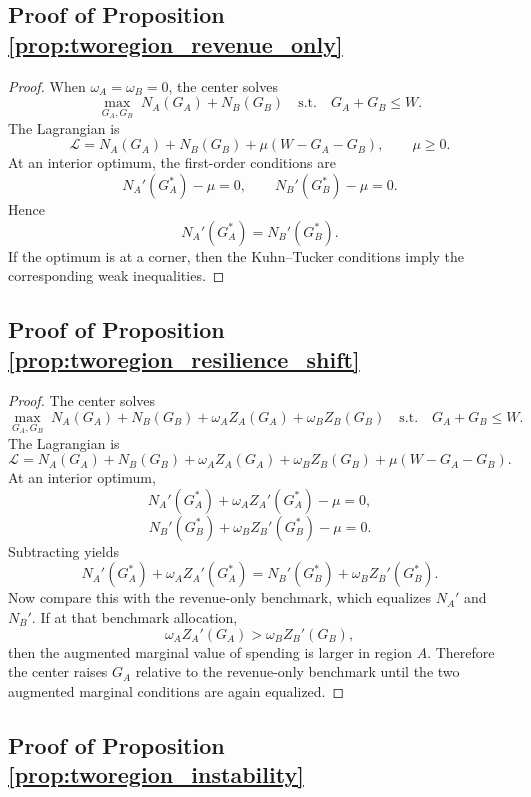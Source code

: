 \documentclass[12pt]{article}
\begin{document}
\subsection{Proof of Proposition \ref{prop:tworegion_revenue_only}}

\begin{proof}
When $\omega_A=\omega_B=0$, the center solves
\[
\max_{G_A,G_B}\; N_A(G_A)+N_B(G_B)
\quad \text{s.t.} \quad G_A+G_B\le W.
\]
The Lagrangian is
\[
\mathcal L = N_A(G_A)+N_B(G_B)+\mu(W-G_A-G_B), \qquad \mu\ge 0.
\]
At an interior optimum, the first-order conditions are
\[
N_A'(G_A^*)-\mu=0, \qquad N_B'(G_B^*)-\mu=0.
\]
Hence
\[
N_A'(G_A^*) = N_B'(G_B^*).
\]
If the optimum is at a corner, then the Kuhn--Tucker conditions imply the corresponding weak inequalities.
\end{proof}

\subsection{Proof of Proposition \ref{prop:tworegion_resilience_shift}}

\begin{proof}
The center solves
\[
\max_{G_A,G_B}\; N_A(G_A)+N_B(G_B)+\omega_A Z_A(G_A)+\omega_B Z_B(G_B)
\quad \text{s.t.} \quad G_A+G_B\le W.
\]
The Lagrangian is
\[
\mathcal L = N_A(G_A)+N_B(G_B)+\omega_A Z_A(G_A)+\omega_B Z_B(G_B)+\mu(W-G_A-G_B).
\]
At an interior optimum,
\[
N_A'(G_A^*)+\omega_A Z_A'(G_A^*)-\mu=0,
\]
\[
N_B'(G_B^*)+\omega_B Z_B'(G_B^*)-\mu=0.
\]
Subtracting yields
\[
N_A'(G_A^*) + \omega_A Z_A'(G_A^*)
=
N_B'(G_B^*) + \omega_B Z_B'(G_B^*).
\]
Now compare this with the revenue-only benchmark, which equalizes $N_A'$ and $N_B'$. If at that benchmark allocation,
\[
\omega_A Z_A'(G_A) > \omega_B Z_B'(G_B),
\]
then the augmented marginal value of spending is larger in region $A$. Therefore the center raises $G_A$ relative to the revenue-only benchmark until the two augmented marginal conditions are again equalized.
\end{proof}

\subsection{Proof of Proposition \ref{prop:tworegion_instability}}
\end{document}
